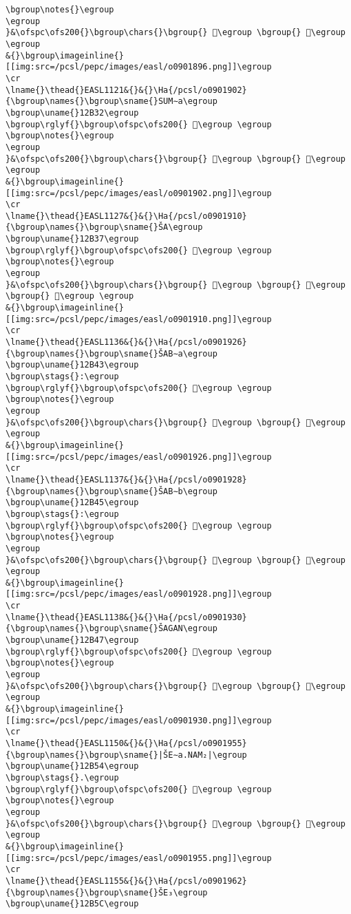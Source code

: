 \begin{verbatim}
\bgroup\notes{}\egroup
\egroup
}&\ofspc\ofs200{}\bgroup\chars{}\bgroup{} 𒬬\egroup \bgroup{} 𒬭\egroup \egroup
&{}\bgroup\imageinline{}[[img:src=/pcsl/pepc/images/easl/o0901896.png]]\egroup
\cr
\lname{}\thead{}EASL1121&{}&{}\Ha{/pcsl/o0901902}{\bgroup\names{}\bgroup\sname{}SUM∼a\egroup
\bgroup\uname{}12B32\egroup
\bgroup\rglyf{}\bgroup\ofspc\ofs200{} 𒬲\egroup \egroup
\bgroup\notes{}\egroup
\egroup
}&\ofspc\ofs200{}\bgroup\chars{}\bgroup{} 𒬰\egroup \bgroup{} 𒬲\egroup \egroup
&{}\bgroup\imageinline{}[[img:src=/pcsl/pepc/images/easl/o0901902.png]]\egroup
\cr
\lname{}\thead{}EASL1127&{}&{}\Ha{/pcsl/o0901910}{\bgroup\names{}\bgroup\sname{}ŠA\egroup
\bgroup\uname{}12B37\egroup
\bgroup\rglyf{}\bgroup\ofspc\ofs200{} 𒬷\egroup \egroup
\bgroup\notes{}\egroup
\egroup
}&\ofspc\ofs200{}\bgroup\chars{}\bgroup{} 𒬻\egroup \bgroup{} 𒬼\egroup \bgroup{} 𒬷\egroup \egroup
&{}\bgroup\imageinline{}[[img:src=/pcsl/pepc/images/easl/o0901910.png]]\egroup
\cr
\lname{}\thead{}EASL1136&{}&{}\Ha{/pcsl/o0901926}{\bgroup\names{}\bgroup\sname{}ŠAB∼a\egroup
\bgroup\uname{}12B43\egroup
\bgroup\stags{}:\egroup
\bgroup\rglyf{}\bgroup\ofspc\ofs200{} 𒭃\egroup \egroup
\bgroup\notes{}\egroup
\egroup
}&\ofspc\ofs200{}\bgroup\chars{}\bgroup{} 𒭂\egroup \bgroup{} 𒭃\egroup \egroup
&{}\bgroup\imageinline{}[[img:src=/pcsl/pepc/images/easl/o0901926.png]]\egroup
\cr
\lname{}\thead{}EASL1137&{}&{}\Ha{/pcsl/o0901928}{\bgroup\names{}\bgroup\sname{}ŠAB∼b\egroup
\bgroup\uname{}12B45\egroup
\bgroup\stags{}:\egroup
\bgroup\rglyf{}\bgroup\ofspc\ofs200{} 𒭅\egroup \egroup
\bgroup\notes{}\egroup
\egroup
}&\ofspc\ofs200{}\bgroup\chars{}\bgroup{} 𒭄\egroup \bgroup{} 𒭅\egroup \egroup
&{}\bgroup\imageinline{}[[img:src=/pcsl/pepc/images/easl/o0901928.png]]\egroup
\cr
\lname{}\thead{}EASL1138&{}&{}\Ha{/pcsl/o0901930}{\bgroup\names{}\bgroup\sname{}ŠAGAN\egroup
\bgroup\uname{}12B47\egroup
\bgroup\rglyf{}\bgroup\ofspc\ofs200{} 𒭇\egroup \egroup
\bgroup\notes{}\egroup
\egroup
}&\ofspc\ofs200{}\bgroup\chars{}\bgroup{} 𒭆\egroup \bgroup{} 𒭇\egroup \egroup
&{}\bgroup\imageinline{}[[img:src=/pcsl/pepc/images/easl/o0901930.png]]\egroup
\cr
\lname{}\thead{}EASL1150&{}&{}\Ha{/pcsl/o0901955}{\bgroup\names{}\bgroup\sname{}|ŠE∼a.NAM₂|\egroup
\bgroup\uname{}12B54\egroup
\bgroup\stags{}.\egroup
\bgroup\rglyf{}\bgroup\ofspc\ofs200{} 𒭔\egroup \egroup
\bgroup\notes{}\egroup
\egroup
}&\ofspc\ofs200{}\bgroup\chars{}\bgroup{} 𒭔\egroup \bgroup{} 𒭕\egroup \egroup
&{}\bgroup\imageinline{}[[img:src=/pcsl/pepc/images/easl/o0901955.png]]\egroup
\cr
\lname{}\thead{}EASL1155&{}&{}\Ha{/pcsl/o0901962}{\bgroup\names{}\bgroup\sname{}ŠE₃\egroup
\bgroup\uname{}12B5C\egroup

\end{verbatim}
